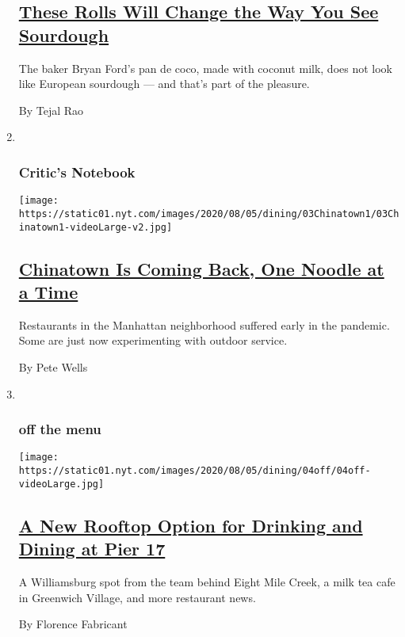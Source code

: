 \begin{enumerate}
  \hypertarget{these-rolls-will-change-the-way-you-see-sourdough}{%
  \subsection{\texorpdfstring{\href{/2020/08/05/magazine/pan-de-coco-recipe-bryan-ford.html}{These
  Rolls Will Change the Way You See
  Sourdough}}{These Rolls Will Change the Way You See Sourdough}}\label{these-rolls-will-change-the-way-you-see-sourdough}}

  The baker Bryan Ford's pan de coco, made with coconut milk, does not
  look like European sourdough --- and that's part of the pleasure.

  By Tejal Rao
\item ~
  \hypertarget{critics-notebook-1}{%
  \subsubsection{Critic's Notebook}\label{critics-notebook-1}}

  \texttt{[image: https://static01.nyt.com/images/2020/08/05/dining/03Chinatown1/03Chinatown1-videoLarge-v2.jpg]}

  \hypertarget{chinatown-is-coming-back-one-noodle-at-a-time}{%
  \subsection{\texorpdfstring{\href{/2020/08/03/dining/chinatown-outdoor-dining-coronavirus.html}{Chinatown
  Is Coming Back, One Noodle at a
  Time}}{Chinatown Is Coming Back, One Noodle at a Time}}\label{chinatown-is-coming-back-one-noodle-at-a-time}}

  Restaurants in the Manhattan neighborhood suffered early in the
  pandemic. Some are just now experimenting with outdoor service.

  By Pete Wells
\item ~
  \hypertarget{off-the-menu}{%
  \subsubsection{off the menu}\label{off-the-menu}}

  \texttt{[image: https://static01.nyt.com/images/2020/08/05/dining/04off/04off-videoLarge.jpg]}

  \hypertarget{a-new-rooftop-option-for-drinking-and-dining-at-pier-17}{%
  \subsection{\texorpdfstring{\href{/2020/08/04/dining/nyc-restaurant-news.html}{A
  New Rooftop Option for Drinking and Dining at Pier
  17}}{A New Rooftop Option for Drinking and Dining at Pier 17}}\label{a-new-rooftop-option-for-drinking-and-dining-at-pier-17}}

  A Williamsburg spot from the team behind Eight Mile Creek, a milk tea
  cafe in Greenwich Village, and more restaurant news.

  By Florence Fabricant
\end{enumerate}

